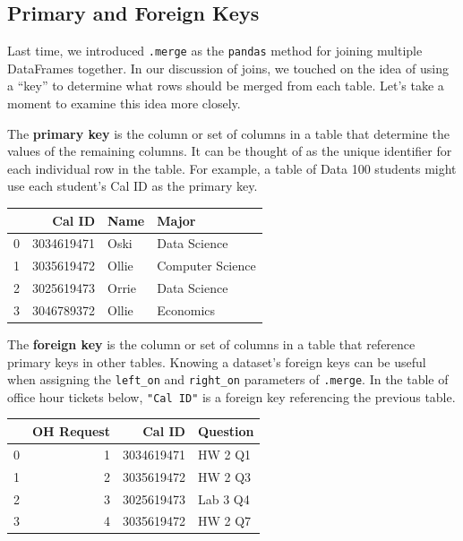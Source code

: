 \documentclass[
  letterpaper,
  DIV=11,
  numbers=noendperiod]{scrreprt}
\begin{document}
\hypertarget{primary-and-foreign-keys}{%
\subsection{Primary and Foreign Keys}\label{primary-and-foreign-keys}}

Last time, we introduced \texttt{.merge} as the \texttt{pandas} method
for joining multiple DataFrames together. In our discussion of joins, we
touched on the idea of using a ``key'' to determine what rows should be
merged from each table. Let's take a moment to examine this idea more
closely.

The \textbf{primary key} is the column or set of columns in a table that
determine the values of the remaining columns. It can be thought of as
the unique identifier for each individual row in the table. For example,
a table of Data 100 students might use each student's Cal ID as the
primary key.

\begin{tabular}{lrll}
\toprule
{} &      Cal ID &   Name &             Major \\
\midrule
0 &  3034619471 &   Oski &      Data Science \\
1 &  3035619472 &  Ollie &  Computer Science \\
2 &  3025619473 &  Orrie &      Data Science \\
3 &  3046789372 &  Ollie &         Economics \\
\bottomrule
\end{tabular}

The \textbf{foreign key} is the column or set of columns in a table that
reference primary keys in other tables. Knowing a dataset's foreign keys
can be useful when assigning the \texttt{left\_on} and
\texttt{right\_on} parameters of \texttt{.merge}. In the table of office
hour tickets below, \texttt{"Cal\ ID"} is a foreign key referencing the
previous table.

\begin{tabular}{lrrl}
\toprule
{} &  OH Request &      Cal ID &  Question \\
\midrule
0 &           1 &  3034619471 &   HW 2 Q1 \\
1 &           2 &  3035619472 &   HW 2 Q3 \\
2 &           3 &  3025619473 &  Lab 3 Q4 \\
3 &           4 &  3035619472 &   HW 2 Q7 \\
\bottomrule
\end{tabular}
\end{document}
